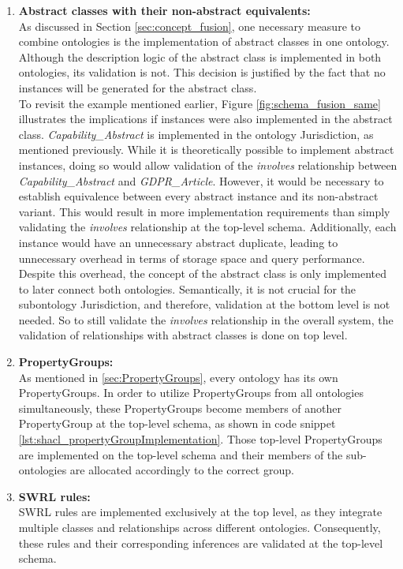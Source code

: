 \documentclass[
  a4paper,  %
  twoside,  %
  bibliography=totoc,
  headsepline,
  cleardoublepage=empty,
  parskip=half,
  draft=false
]{scrbook}
\begin{document}
\begin{enumerate}
   \item \textbf{Abstract classes with their non-abstract equivalents:} \\
    As discussed in Section \ref{sec:concept_fusion}, one necessary measure to combine ontologies is the implementation of abstract classes in one ontology. Although the description logic of the abstract class is implemented in both ontologies, its validation is not. This decision is justified by the fact that no instances will be generated for the abstract class. \\
    To revisit the example mentioned earlier, Figure \ref{fig:schema_fusion_same} illustrates the implications if instances were also implemented in the abstract class. \textit{Capability\_Abstract} is implemented in the ontology Jurisdiction, as mentioned previously. While it is theoretically possible to implement abstract instances, doing so would allow validation of the \textit{involves} relationship between \textit{Capability\_Abstract} and \textit{GDPR\_Article}. However, it would be necessary to establish equivalence between every abstract instance and its non-abstract variant. This would result in more implementation requirements than simply validating the \textit{involves} relationship at the top-level schema. Additionally, each instance would have an unnecessary abstract duplicate, leading to unnecessary overhead in terms of storage space and query performance. \\
    Despite this overhead, the concept of the abstract class is only implemented to later connect both ontologies. Semantically, it is not crucial for the subontology Jurisdiction, and therefore, validation at the bottom level is not needed. So to still validate the \textit{involves} relationship in the overall system, the validation of relationships with abstract classes is done on top level. 
    \item \textbf{PropertyGroups:} \\
    As mentioned in \ref{sec:PropertyGroups}, every ontology has its own PropertyGroups. In order to utilize PropertyGroups from all ontologies simultaneously, these PropertyGroups become members of another PropertyGroup at the top-level schema, as shown in code snippet  \ref{lst:shacl_propertyGroupImplementation}. Those top-level PropertyGroups are implemented on the top-level schema and their members of the sub-ontologies are allocated accordingly to the correct group.
    \item \textbf{SWRL rules:} \\
       SWRL rules are implemented exclusively at the top level, as they integrate multiple classes and relationships across different ontologies. Consequently, these rules and their corresponding inferences are validated at the top-level schema.
\end{enumerate}
\end{document}
